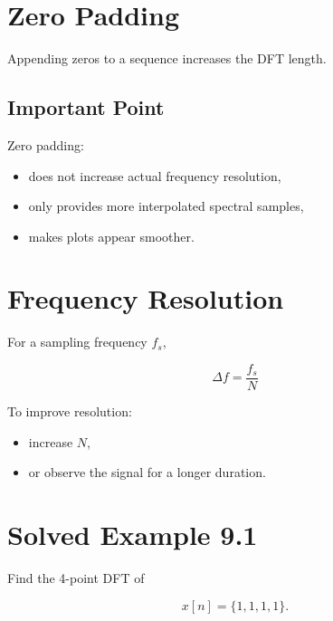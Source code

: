 
\section{Zero Padding}

Appending zeros to a sequence increases the DFT length.


\subsection{Important Point}

Zero padding:

\begin{itemize}
\item does not increase actual frequency resolution,
\item only provides more interpolated spectral samples,
\item makes plots appear smoother.
\end{itemize}


\section{Frequency Resolution}

For a sampling frequency \(f_s\),

\[
\boxed{
\Delta f=\frac{f_s}{N}
}
\]

To improve resolution:

\begin{itemize}
\item increase \(N\),
\item or observe the signal for a longer duration.
\end{itemize}


\section{Solved Example 9.1}

Find the 4-point DFT of

\[
x[n]=\{1,1,1,1\}.
\]

